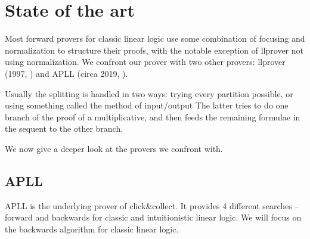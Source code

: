 \documentclass[a4paper, 12pt, tesi, english]{report}
\begin{document}



\section{State of the art}
Most forward provers for classic linear logic use some combination of focusing and normalization to structure their proofs, with the notable exception of llprover not using normalization.	%
We confront our prover with two other provers: llprover (1997, %
) and APLL (circa 2019, %
).

Usually the splitting is handled in two ways: trying every partition possible, or using something called the method of input/output %
The latter tries to do one branch of the proof of a multiplicative, and then feeds the remaining formulae in the sequent to the other branch.

We now give a deeper look at the provers we confront with.

\subsection{APLL}\label{sec:apll}
APLL is the underlying prover of click\&collect. %
It provides 4 different searches -- forward and backwards for classic and intuitionistic linear logic. 
We will focus on the backwards algorithm for classic linear logic.
\end{document}
